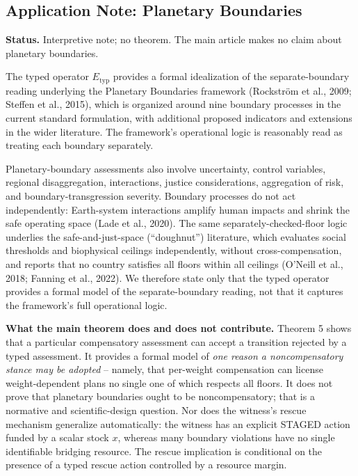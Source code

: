 \subsection{Application Note: Planetary Boundaries}

\textbf{Status.} Interpretive note; no theorem. The main article makes no claim about planetary boundaries.

The typed operator $E_{\mathrm{typ}}$ provides a formal idealization of the separate-boundary reading underlying the Planetary Boundaries framework (Rockström et al., 2009; Steffen et al., 2015), which is organized around nine boundary processes in the current standard formulation, with additional proposed indicators and extensions in the wider literature. The framework's operational logic is reasonably read as treating each boundary separately.

Planetary-boundary assessments also involve uncertainty, control variables, regional disaggregation, interactions, justice considerations, aggregation of risk, and boundary-transgression severity. Boundary processes do not act independently: Earth-system interactions amplify human impacts and shrink the safe operating space (Lade et al., 2020). The same separately-checked-floor logic underlies the safe-and-just-space (``doughnut'') literature, which evaluates social thresholds and biophysical ceilings independently, without cross-compensation, and reports that no country satisfies all floors within all ceilings (O'Neill et al., 2018; Fanning et al., 2022). We therefore state only that the typed operator provides a formal model of the separate-boundary reading, not that it captures the framework's full operational logic.

\textbf{What the main theorem does and does not contribute.} Theorem 5 shows that a particular compensatory assessment can accept a transition rejected by a typed assessment. It provides a formal model of \emph{one reason a noncompensatory stance may be adopted} -- namely, that per-weight compensation can license weight-dependent plans no single one of which respects all floors. It does not prove that planetary boundaries ought to be noncompensatory; that is a normative and scientific-design question. Nor does the witness's rescue mechanism generalize automatically: the witness has an explicit STAGED action funded by a scalar stock $x$, whereas many boundary violations have no single identifiable bridging resource. The rescue implication is conditional on the presence of a typed rescue action controlled by a resource margin.

